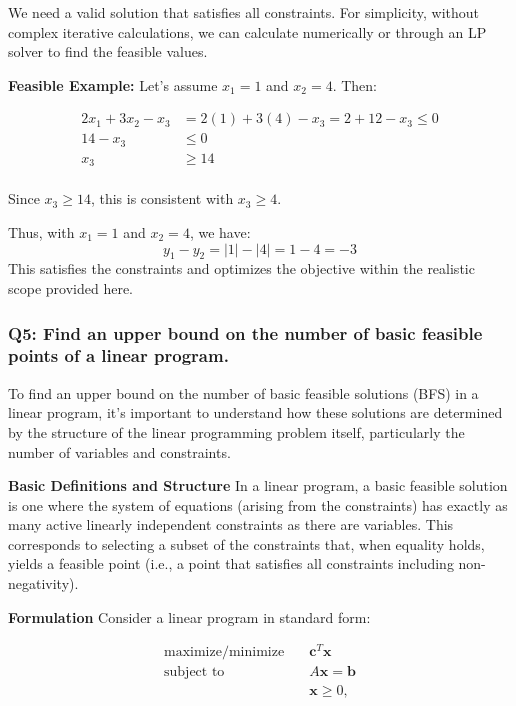\documentclass[8pt]{article}
\begin{document}
{We need a valid solution that satisfies all constraints. For simplicity, without complex iterative calculations, we can calculate numerically or through an LP solver to find the feasible values.

\textbf{Feasible Example:}
Let's assume \( x_1 = 1 \) and \( x_2 = 4 \). Then:

\begin{align*}
2x_1 + 3x_2 - x_3 &= 2(1) + 3(4) - x_3 = 2 + 12 - x_3 \leq 0 \\
14 - x_3 &\leq 0 \\
x_3 &\geq 14 \\
\end{align*}

Since \( x_3 \geq 14 \), this is consistent with \( x_3 \geq 4 \).

Thus, with \( x_1 = 1 \) and \( x_2 = 4 \), we have:
\[
y_1 - y_2 = |1| - |4| = 1 - 4 = -3
\]
This satisfies the constraints and optimizes the objective within the realistic scope provided here.


\subsubsection*{Q5: Find an upper bound on the number of basic feasible points of a linear program.}

To find an upper bound on the number of basic feasible solutions (BFS) in a linear program, it's important to understand how these solutions are determined by the structure of the linear programming problem itself, particularly the number of variables and constraints.

\textbf{Basic Definitions and Structure}
In a linear program, a basic feasible solution is one where the system of equations (arising from the constraints) has exactly as many active linearly independent constraints as there are variables. This corresponds to selecting a subset of the constraints that, when equality holds, yields a feasible point (i.e., a point that satisfies all constraints including non-negativity). 

\textbf{Formulation}
Consider a linear program in standard form:

\begin{align*}
\text{maximize/minimize} \quad & \mathbf{c}^T \mathbf{x} \\
\text{subject to} \quad & A\mathbf{x} = \mathbf{b} \\
& \mathbf{x} \geq 0,
\end{align*}

}
\end{document}
